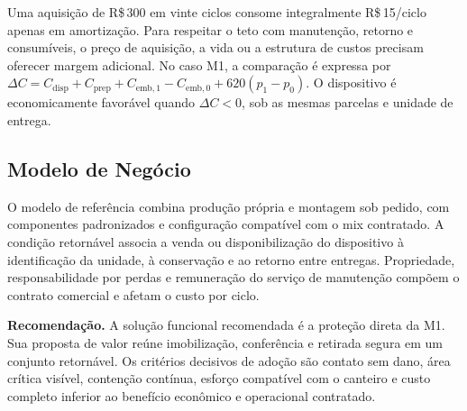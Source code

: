 Uma aquisição de R\$\,300 em vinte ciclos consome integralmente R\$\,15/ciclo apenas em amortização. Para respeitar o teto com manutenção, retorno e consumíveis, o preço de aquisição, a vida ou a estrutura de custos precisam oferecer margem adicional. No caso M1, a comparação é expressa por $\Delta C=C_{\mathrm{disp}}+C_{\mathrm{prep}}+C_{\mathrm{emb,1}}-C_{\mathrm{emb,0}}+620(p_1-p_0)$. O dispositivo é economicamente favorável quando $\Delta C<0$, sob as mesmas parcelas e unidade de entrega.

\subsection{Modelo de Negócio}

O modelo de referência combina produção própria e montagem sob pedido, com componentes padronizados e configuração compatível com o mix contratado. A condição retornável associa a venda ou disponibilização do dispositivo à identificação da unidade, à conservação e ao retorno entre entregas. Propriedade, responsabilidade por perdas e remuneração do serviço de manutenção compõem o contrato comercial e afetam o custo por ciclo.

\noindent\textbf{Recomendação.} A solução funcional recomendada é a proteção direta da M1. Sua proposta de valor reúne imobilização, conferência e retirada segura em um conjunto retornável. Os critérios decisivos de adoção são contato sem dano, área crítica visível, contenção contínua, esforço compatível com o canteiro e custo completo inferior ao benefício econômico e operacional contratado.
